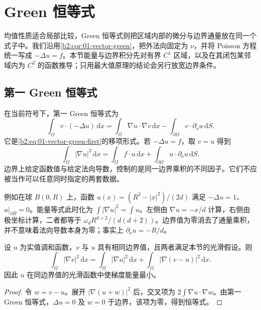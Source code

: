 \section{Green 恒等式}
\label{b2:sec:1302}

均值性质适合局部比较，Green 恒等式则把区域内部的微分与边界通量放在同一个式子中。我们沿用\cref{b2:cor:01-vector-green}，把外法向固定为 \(\nu\)，并将 Poisson 方程统一写成 \(-\Delta u=f\)。本节能量与边界积分先对有界 \(C^1\) 区域，以及在其闭包某邻域内为 \(C^2\) 的函数推导；只用最大值原理的结论会另行放宽边界条件。

\subsection{第一 Green 恒等式}
\label{b2:subsec:130201}

在当前符号下，第一 Green 恒等式为
\begin{equation}\label{b2:eq:13-green-first}
 \int_\Omega v\cdot(-\Delta u)\,\mathrm{d}x
 =\int_\Omega\nabla u\cdot\nabla v\,\mathrm{d}x
  -\int_{\partial\Omega}v\cdot\partial_\nu u\,\mathrm{d}S.
\end{equation}
它是\eqref{b2:eq:01-vector-green-first}的移项形式。若 \(-\Delta u=f\)，取 \(v=u\) 得到
\[
 \int_\Omega|\nabla u|^2\,\mathrm{d}x
 =\int_\Omega f\cdot u\,\mathrm{d}x
  +\int_{\partial\Omega}u\cdot\partial_\nu u\,\mathrm{d}S.
\]
边界上给定函数值与给定法向导数，控制的是同一边界乘积的不同因子。它们不应被当作可以任意同时指定的两套数据。

\ProseParagraphBreak

例如在球 \(B(0,R)\) 上，函数 \(u(x)=(R^2-|x|^2)/(2d)\) 满足 \(-\Delta u=1\)、\(u|_{\partial B}=0\)。能量等式此时化为 \(\int|\nabla u|^2=\int u\)。左侧由 \(\nabla u=-x/d\) 计算，右侧由极坐标计算，二者都等于 \(\omega_dR^{d+2}/(d(d+2))\)。边界值为零消去了通量乘积，并不意味着法向导数本身为零；事实上 \(\partial_\nu u=-R/d\)。

\begin{proposition}\label{b2:prop:13-dirichlet-energy}
设 \(u\) 为实值调和函数，\(v\) 与 \(u\) 具有相同边界值，且两者满足本节的光滑假设。则
\[
 \int_\Omega|\nabla v|^2\,\mathrm{d}x
 =\int_\Omega|\nabla u|^2\,\mathrm{d}x
  +\int_\Omega|\nabla(v-u)|^2\,\mathrm{d}x.
\]
因此 \(u\) 在同边界值的光滑函数中使梯度能量最小。
\end{proposition}
\begin{proof}
令 \(w=v-u\)。展开 \(|\nabla(u+w)|^2\) 后，交叉项为 \(2\int\nabla u\cdot\nabla w\)。由第一 Green 恒等式，\(\Delta u=0\) 及 \(w=0\) 于边界，该项为零，得到恒等式。
\end{proof}

